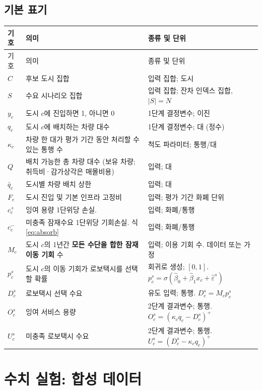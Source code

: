 \documentclass[10pt,a4paper]{article}
\begin{document}
\subsection{기본 표기}
{\footnotesize
\begin{longtable}{@{}L{0.10\textwidth}L{0.43\textwidth}L{0.41\textwidth}@{}}
\toprule 기호 & 의미 & 종류 및 단위\\\midrule\endfirsthead
\toprule 기호 & 의미 & 종류 및 단위\\\midrule\endhead\bottomrule\endlastfoot
$C$ & 후보 도시 집합 & 입력 집합; 도시\\
$S$ & 수요 시나리오 집합 & 입력 집합; 잔차 인덱스 집합, $|S|=N$\\
$y_c$ & 도시 $c$에 진입하면 1, 아니면 0 & 1단계 결정변수; 이진\\
$q_c$ & 도시 $c$에 배치하는 차량 대수 & 1단계 결정변수; 대 (정수)\\
$\kappa_c$ & 차량 한 대가 평가 기간 동안 처리할 수 있는 통행 수 & 척도 파라미터; 통행/대\\
$Q$ & 배치 가능한 총 차량 대수 (보유 차량; 취득비·감가상각은 매몰비용) & 입력; 대\\
$\bar q_c$ & 도시별 차량 배치 상한 & 입력; 대\\
$F_c$ & 도시 진입 및 기본 인프라 고정비 & 입력; 평가 기간 화폐 단위\\
$c_c^+$ & 잉여 용량 1단위당 손실. & 입력; 화폐/통행\\
$c_c^-$ & 미충족 잠재수요 1단위당 기회손실. 식 \eqref{eq:absorb} & 입력; 화폐/통행\\
$M_c$ & 도시 $c$의 1년간 \textbf{모든 수단을 합한 잠재 이동 기회} 수 & 입력; 이용 기회 수. 데이터 또는 가정\\
$p_c^s$ & 도시 $c$의 이동 기회가 로보택시를 선택할 확률 & 회귀로 생성; $[0,1]$. $p_c^s=\sigma(\hat\beta_0+\hat\beta_1x_c+\hat\varepsilon^s)$\\
$D_c^s$ & 로보택시 선택 수요 & 유도 입력; 통행. $D_c^s=M_c p_c^s$\\
$O_c^s$ & 잉여 서비스 용량 & 2단계 결과변수; 통행. $O_c^s=(\kappa_c q_c-D_c^s)^+$\\
$U_c^s$ & 미충족 로보택시 수요 & 2단계 결과변수; 통행. $U_c^s=(D_c^s-\kappa_c q_c)^+$\\
\end{longtable}}


\section{수치 실험: 합성 데이터}
\end{document}
